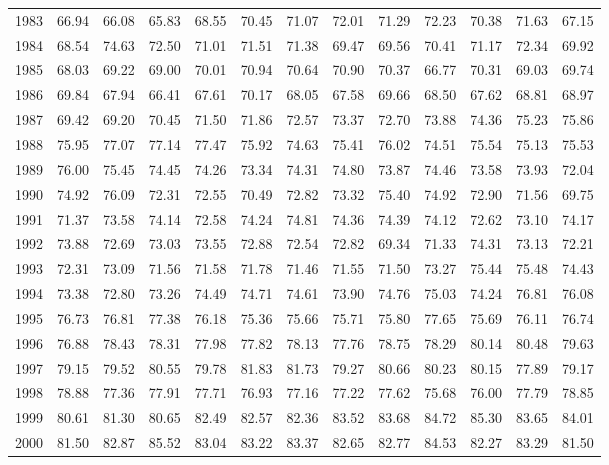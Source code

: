 \begin{longtable}{rrrrrrrrrrrrr}
  1983 & 66.94 & 66.08 & 65.83 & 68.55 & 70.45 & 71.07 & 72.01 & 71.29 & 72.23 & 70.38 & 71.63 & 67.15 \\ 
  1984 & 68.54 & 74.63 & 72.50 & 71.01 & 71.51 & 71.38 & 69.47 & 69.56 & 70.41 & 71.17 & 72.34 & 69.92 \\ 
  1985 & 68.03 & 69.22 & 69.00 & 70.01 & 70.94 & 70.64 & 70.90 & 70.37 & 66.77 & 70.31 & 69.03 & 69.74 \\ 
  1986 & 69.84 & 67.94 & 66.41 & 67.61 & 70.17 & 68.05 & 67.58 & 69.66 & 68.50 & 67.62 & 68.81 & 68.97 \\ 
  1987 & 69.42 & 69.20 & 70.45 & 71.50 & 71.86 & 72.57 & 73.37 & 72.70 & 73.88 & 74.36 & 75.23 & 75.86 \\ 
  1988 & 75.95 & 77.07 & 77.14 & 77.47 & 75.92 & 74.63 & 75.41 & 76.02 & 74.51 & 75.54 & 75.13 & 75.53 \\ 
  1989 & 76.00 & 75.45 & 74.45 & 74.26 & 73.34 & 74.31 & 74.80 & 73.87 & 74.46 & 73.58 & 73.93 & 72.04 \\ 
  1990 & 74.92 & 76.09 & 72.31 & 72.55 & 70.49 & 72.82 & 73.32 & 75.40 & 74.92 & 72.90 & 71.56 & 69.75 \\ 
  1991 & 71.37 & 73.58 & 74.14 & 72.58 & 74.24 & 74.81 & 74.36 & 74.39 & 74.12 & 72.62 & 73.10 & 74.17 \\ 
  1992 & 73.88 & 72.69 & 73.03 & 73.55 & 72.88 & 72.54 & 72.82 & 69.34 & 71.33 & 74.31 & 73.13 & 72.21 \\ 
  1993 & 72.31 & 73.09 & 71.56 & 71.58 & 71.78 & 71.46 & 71.55 & 71.50 & 73.27 & 75.44 & 75.48 & 74.43 \\ 
  1994 & 73.38 & 72.80 & 73.26 & 74.49 & 74.71 & 74.61 & 73.90 & 74.76 & 75.03 & 74.24 & 76.81 & 76.08 \\ 
  1995 & 76.73 & 76.81 & 77.38 & 76.18 & 75.36 & 75.66 & 75.71 & 75.80 & 77.65 & 75.69 & 76.11 & 76.74 \\ 
  1996 & 76.88 & 78.43 & 78.31 & 77.98 & 77.82 & 78.13 & 77.76 & 78.75 & 78.29 & 80.14 & 80.48 & 79.63 \\ 
  1997 & 79.15 & 79.52 & 80.55 & 79.78 & 81.83 & 81.73 & 79.27 & 80.66 & 80.23 & 80.15 & 77.89 & 79.17 \\ 
  1998 & 78.88 & 77.36 & 77.91 & 77.71 & 76.93 & 77.16 & 77.22 & 77.62 & 75.68 & 76.00 & 77.79 & 78.85 \\ 
  1999 & 80.61 & 81.30 & 80.65 & 82.49 & 82.57 & 82.36 & 83.52 & 83.68 & 84.72 & 85.30 & 83.65 & 84.01 \\ 
  2000 & 81.50 & 82.87 & 85.52 & 83.04 & 83.22 & 83.37 & 82.65 & 82.77 & 84.53 & 82.27 & 83.29 & 81.50 \\ 

\end{longtable}
